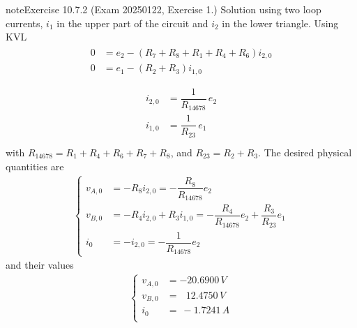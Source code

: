 \documentclass[letterpaper,10pt,italian]{jupyterBook}
\begin{document}
\begin{sphinxadmonition}{note}{Exercise 10.7.2 (Exam 2025\sphinxhyphen{}01\sphinxhyphen{}22, Exercise 1.)}
\sphinxAtStartPar
Solution using two loop currents, \(i_1\) in the upper part of the circuit and \(i_2\) in the lower triangle. Using KVL
\begin{equation*}
\begin{split}\begin{aligned}
  0 & = e_2 - (R_7+R_8+R_1+R_4+R_6) i_{2,0} \\
  0 & = e_1 - (R_2+R_3) i_{1,0} \\
\end{aligned}
\end{split}
\end{equation*}\begin{equation*}
\begin{split}
\begin{aligned}
  i_{2,0} & = \dfrac{1}{R_{14678}} \, e_2 \\
  i_{1,0} & = \dfrac{1}{R_{23}} \, e_1 \\
\end{aligned}\end{split}
\end{equation*}
\sphinxAtStartPar
with \(R_{14678} = R_1+R_4+R_6+R_7+R_8\), and \(R_{23} = R_2 + R_3\). The desired physical quantities are
\begin{equation*}
\begin{split}\begin{cases}
  v_{A,0} & = - R_8 i_{2,0} = -\dfrac{R_8}{R_{14678}} e_2 \\ 
  v_{B,0} & = - R_4 i_{2,0} + R_3 i_{1,0} = - \dfrac{R_4}{R_{14678}} e_2 + \dfrac{R_3}{R_{23}} e_1 \\
  i_{0} & = - i_{2,0} = - \dfrac{1}{R_{14678}} e_2
\end{cases}\end{split}
\end{equation*}
\sphinxAtStartPar
and their values
\begin{equation*}
\begin{split}\begin{cases}
 v_{A,0} & =     - 20.6900 \, V \\
 v_{B,0} & = \ \ \ 12.4750 \, V \\
   i_{0} & = \    - 1.7241 \, A \\
\end{cases}\end{split}
\end{equation*}
\begin{figure}[htbp]
\centering

\noindent{}
\end{figure}

\end{sphinxadmonition}
\end{document}
